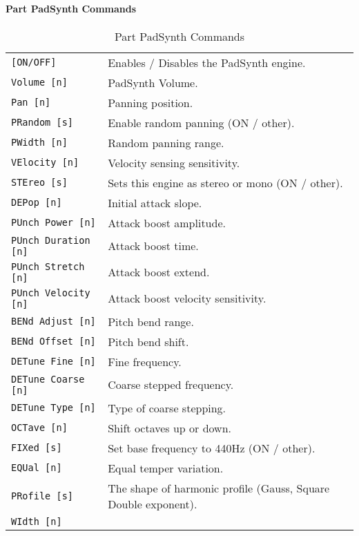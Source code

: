 \paragraph{Part PadSynth Commands}
\label{paragraph:command_line_part_padsynth_commands}

   \begin{table}[H]
      \centering
      \caption{Part PadSynth Commands}
      \label{table:yoshimi_part_padsynth_commands}
      \begin{tabular}{l l}
\texttt{[ON/OFF]} &
   Enables / Disables the PadSynth engine. \\
\texttt{Volume [n]} &
   PadSynth Volume. \\
\texttt{Pan [n]} &
   Panning position.\\
\texttt{PRandom [s]} &
   Enable random panning (ON / other).\\
\texttt{PWidth [n]} &
   Random panning range.\\
\texttt{VElocity [n]} &
   Velocity sensing sensitivity. \\
\texttt{STEreo [s]} &
   Sets this engine as stereo or mono (ON / other). \\
\texttt{DEPop [n]} &
   Initial attack slope.   \\
\texttt{PUnch Power [n]} &
   Attack boost amplitude. \\
\texttt{PUnch Duration [n]} &
   Attack boost time. \\
\texttt{PUnch Stretch [n]} &
   Attack boost extend. \\
\texttt{PUnch Velocity [n]} &
   Attack boost velocity sensitivity. \\
\texttt{BENd Adjust [n]} &
   Pitch bend range. \\
\texttt{BENd Offset [n]} &
   Pitch bend shift. \\
\texttt{DETune Fine [n]} &
   Fine frequency. \\
\texttt{DETune Coarse [n]} &
   Coarse stepped frequency. \\
\texttt{DETune Type [n]} &
   Type of coarse stepping. \\
\texttt{OCTave [n]} &
   Shift octaves up or down. \\
\texttt{FIXed [s]} &
   Set base frequency to 440Hz (ON / other). \\
\texttt{EQUal [n]} &
   Equal temper variation. \\
\texttt{PRofile [s]} &
   The shape of harmonic profile (Gauss, Square Double exponent). \\
\texttt{WIdth [n]} &

\end{tabular}
\end{table}
